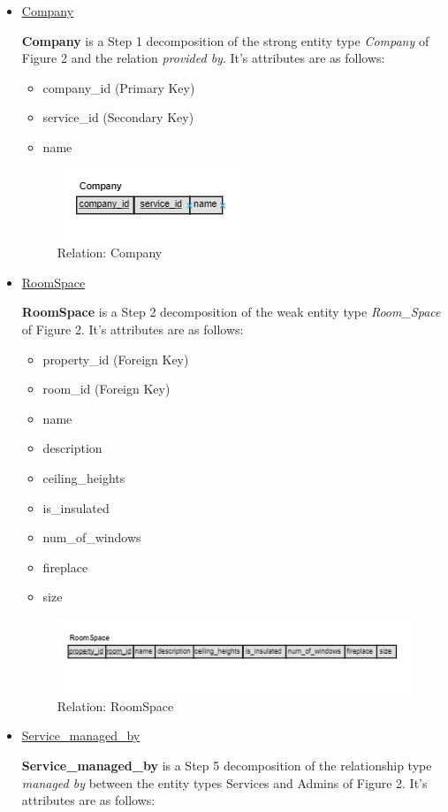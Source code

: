 \documentclass[12pt,a4paper]{report}
\begin{document}
\begin{itemize}
\item \underline{Company} \par 
\textbf{Company} is a Step 1 decomposition of the strong entity type \textit{Company} of Figure 2 and the relation \textit{provided by}. It's attributes are as follows:
\begin{itemize}
\item company\_id (Primary Key)
\item service\_id (Secondary Key)
\item name
\end{itemize}
\begin{figure}[H]
\centering
\includegraphics[scale=1.5]{company.png}
\caption{Relation: Company}
\label{Figure:company}
\end{figure}

\item \underline{RoomSpace} \par 
\textbf{RoomSpace} is a Step 2 decomposition of the weak entity type \textit{Room\_Space} of Figure 2. It's attributes are as follows:
\begin{itemize}
\item property\_id (Foreign Key)
\item room\_id (Foreign Key)
\item name
\item description
\item ceiling\_heights
\item is\_insulated
\item num\_of\_windows
\item fireplace
\item size
\end{itemize}
\begin{figure}[H]
\centering
\includegraphics[scale=1.75]{roomspace.png}
\caption{Relation: RoomSpace}
\label{Figure:RS}
\end{figure} 

\item \underline{Service\_managed\_by} \par 
\textbf{Service\_managed\_by} is a Step 5 decomposition of the relationship type \textit{managed by} between the entity types Services and Admins of Figure 2. It's attributes are as follows:


\end{itemize}
\end{document}
